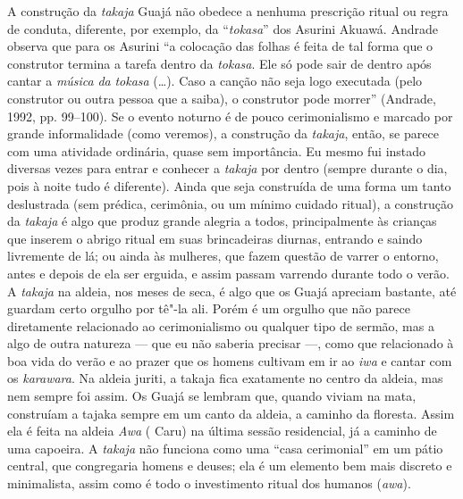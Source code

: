 A construção da \emph{takaja} Guajá não obedece a nenhuma prescrição
ritual ou regra de conduta, diferente, por exemplo, da ``\emph{tokasa}''
dos Asurini Akuawá. Andrade observa que para os Asurini ``a colocação das
folhas é feita de tal forma que o construtor termina a tarefa dentro da
\emph{tokasa}. Ele só pode sair de dentro após cantar a \emph{música}
\emph{da} \emph{tokasa} (\ldots{}). Caso a canção não seja logo executada
(pelo construtor ou outra pessoa que a saiba), o construtor pode morrer''
(Andrade, 1992, pp. 99--100). Se o evento noturno é de pouco
cerimonialismo e marcado por grande informalidade (como veremos), a
construção da \emph{takaja}, então, se parece com uma atividade
ordinária, quase sem importância. Eu mesmo fui instado diversas vezes
para entrar e conhecer a \emph{takaja} por dentro (sempre durante o dia,
pois à noite tudo é diferente). Ainda que seja construída de uma forma
um tanto deslustrada (sem prédica, cerimônia, ou um mínimo cuidado
ritual), a construção da \emph{takaja} é algo que produz grande alegria
a todos, principalmente às crianças que inserem o abrigo ritual em suas
brincadeiras diurnas, entrando e saindo livremente de lá; ou ainda às
mulheres, que fazem questão de varrer o entorno, antes e depois de ela
ser erguida, e assim passam varrendo durante todo o verão. A
\emph{takaja} na aldeia, nos meses de seca, é algo que os Guajá apreciam
bastante, até guardam certo orgulho por tê"-la ali. Porém é um orgulho
que não parece diretamente relacionado ao cerimonialismo ou qualquer
tipo de sermão, mas a algo de outra natureza --- que eu não saberia
precisar ---, como que relacionado à boa vida do verão e ao prazer que os
homens cultivam em ir ao \emph{iwa} e cantar com os \emph{karawara}. Na
aldeia juriti, a takaja fica exatamente no centro da aldeia, mas nem
sempre foi assim. Os Guajá se lembram que, quando viviam na mata,
construíam a tajaka sempre em um canto da aldeia, a caminho da floresta.
Assim ela é feita na aldeia \emph{Awa} ( Caru) na última sessão
residencial, já a caminho de uma capoeira. A \emph{takaja} não funciona
como uma ``casa cerimonial'' em um pátio central, que congregaria homens
e deuses; ela é um elemento bem mais discreto e minimalista, assim como
é todo o investimento ritual dos humanos (\emph{awa}).

